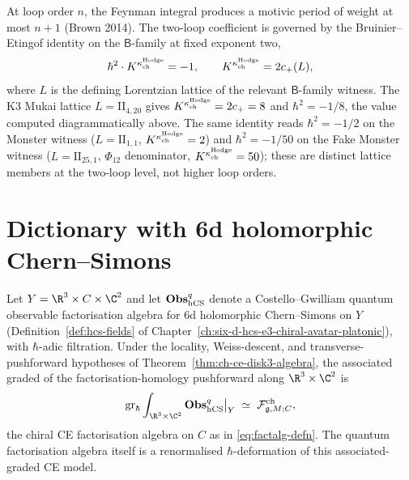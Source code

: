 \begin{remark}
\label{rem:ch-ce-transcendence-bound}
%
At loop order $n$, the Feynman integral produces a motivic period of
weight at most $n+1$ (Brown 2014). The two-loop coefficient is governed
by the Bruinier--Etingof identity on the $\mathsf{B}$-family at fixed
exponent two,
\[
\hbar^2\cdot K^{\kappa_{\mathrm{ch}}^{\mathrm{Hodge}}} = -1,
\qquad K^{\kappa_{\mathrm{ch}}^{\mathrm{Hodge}}} = 2c_+(L),
\]
where $L$ is the defining Lorentzian lattice of the relevant
$\mathsf{B}$-family witness. The K3 Mukai lattice
$L = \mathrm{II}_{4,20}$ gives $K^{\kappa_{\mathrm{ch}}^{\mathrm{Hodge}}} = 2c_+ = 8$ and
$\hbar^2 = -1/8$, the value computed diagrammatically above. The same
identity reads $\hbar^2 = -1/2$ on the Monster witness
($L = \mathrm{II}_{1,1}$, $K^{\kappa_{\mathrm{ch}}^{\mathrm{Hodge}}} = 2$) and
$\hbar^2 = -1/50$ on the Fake Monster witness
($L = \mathrm{II}_{25,1}$, $\Phi_{12}$ denominator,
$K^{\kappa_{\mathrm{ch}}^{\mathrm{Hodge}}} = 50$); these are distinct lattice members at the
two-loop level, not higher loop orders.
\end{remark}

\section{Dictionary with 6d holomorphic Chern--Simons}
\label{sec:ch-ce-dict-6d-hcs}

\begin{theorem}
\label{thm:ch-ce-6d-hcs-reduction}
%
Let $Y = \R^3\times C\times\C^2$ and let $\mathbf{Obs}^q_{\mathrm{hCS}}$ denote a
Costello--Gwilliam quantum observable factorisation algebra for 6d
holomorphic Chern--Simons on $Y$ (Definition~\ref{def:hcs-fields} of
Chapter~\ref{ch:six-d-hcs-e3-chiral-avatar-platonic}), with
$\hbar$-adic filtration. Under the locality, Weiss-descent, and
transverse-pushforward hypotheses of
Theorem~\ref{thm:ch-ce-disk3-algebra}, the associated graded of the
factorisation-homology pushforward along $\R^3\times\C^2$ is
\begin{equation}
\label{eq:6d-hcs-reduces-to-chiral-CE}
\operatorname{gr}_{\hbar}
\int_{\R^3\times\C^2}\Fobs^q_{\hCS}\bigr|_Y
\;\simeq\;
\cF^{\mathrm{ch}}_{\fg,M;C},
\end{equation}
the chiral CE factorisation algebra on $C$ as in
\eqref{eq:factalg-defn}. The quantum factorisation algebra itself is a
renormalised $\hbar$-deformation of this associated-graded CE model.
\end{theorem}

